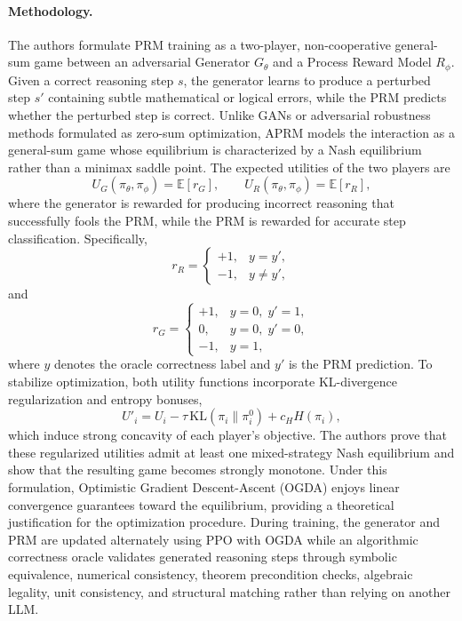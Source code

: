 \documentclass[11pt]{article}
\begin{document}
\paragraph{Methodology.}
The authors formulate PRM training as a two-player, non-cooperative general-sum game between an adversarial Generator \(G_\theta\) and a Process Reward Model \(R_\phi\). Given a correct reasoning step \(s\), the generator learns to produce a perturbed step \(s'\) containing subtle mathematical or logical errors, while the PRM predicts whether the perturbed step is correct. Unlike GANs or adversarial robustness methods formulated as zero-sum optimization, APRM models the interaction as a general-sum game whose equilibrium is characterized by a Nash equilibrium rather than a minimax saddle point.
The expected utilities of the two players are
\[
U_G(\pi_\theta,\pi_\phi)
=
\mathbb{E}[r_G],
\qquad
U_R(\pi_\theta,\pi_\phi)
=
\mathbb{E}[r_R],
\]
where the generator is rewarded for producing incorrect reasoning that successfully fools the PRM, while the PRM is rewarded for accurate step classification. Specifically,
\[
r_R=
\begin{cases}
+1,& y=y',\\
-1,& y\neq y',
\end{cases}
\]
and
\[
r_G=
\begin{cases}
+1,& y=0,\;y'=1,\\
0,& y=0,\;y'=0,\\
-1,& y=1,
\end{cases}
\]
where \(y\) denotes the oracle correctness label and \(y'\) is the PRM prediction.
To stabilize optimization, both utility functions incorporate KL-divergence regularization and entropy bonuses,
\[
U'_i
=
U_i
-
\tau\,\mathrm{KL}(\pi_i\|\pi_i^{0})
+
c_H H(\pi_i),
\]
which induce strong concavity of each player's objective. The authors prove that these regularized utilities admit at least one mixed-strategy Nash equilibrium and show that the resulting game becomes strongly monotone. Under this formulation, Optimistic Gradient Descent-Ascent (OGDA) enjoys linear convergence guarantees toward the equilibrium, providing a theoretical justification for the optimization procedure. During training, the generator and PRM are updated alternately using PPO with OGDA while an algorithmic correctness oracle validates generated reasoning steps through symbolic equivalence, numerical consistency, theorem precondition checks, algebraic legality, unit consistency, and structural matching rather than relying on another LLM. 
\end{document}

